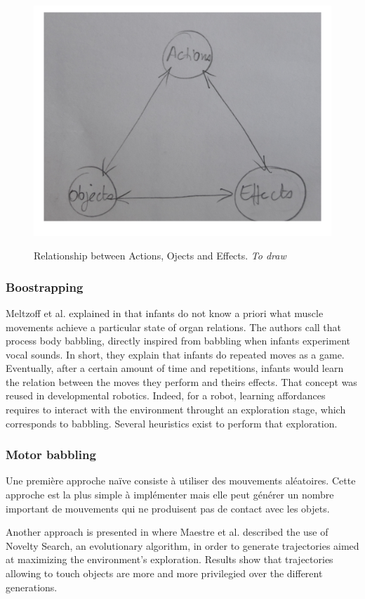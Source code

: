 \documentclass{llncs}
\begin{document}
\begin{figure}
	\centering
	\includegraphics[width=.4\textwidth]{figures/affordances}
	\label{fig:affordances}
	\caption{Relationship between Actions, Ojects and Effects. \textit{To draw}}
\end{figure}

\subsubsection{Boostrapping}
Meltzoff et al. explained in \cite{EDP:EDP157} that infants do not know a priori what muscle movements achieve a particular state of organ relations. The authors call that process body babbling, directly inspired from babbling when infants experiment vocal sounds. In short, they explain that infants do repeated moves as a game. Eventually, after a certain amount of time and repetitions, infants would learn the relation between the moves they perform and theirs effects. That concept was reused in developmental robotics. Indeed, for a robot, learning affordances requires to interact with the environment throught an exploration stage, which corresponds to babbling. Several heuristics exist to perform that exploration.

\subsubsection{Motor babbling}
Une première approche naïve consiste à utiliser des mouvements aléatoires. Cette approche est la plus simple à implémenter mais elle peut générer un nombre important de mouvements qui ne produisent pas de contact avec les objets.

Another approach is presented in \cite{Maestre2015} where Maestre et al. described the use of Novelty Search, an evolutionary algorithm, in order to generate trajectories aimed at maximizing the environment's exploration. Results show that trajectories allowing to touch objects are more and more privilegied over the different generations.

\end{document}
